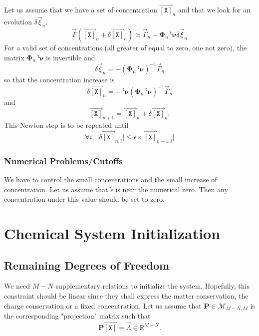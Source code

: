 \documentclass[aps,twocolumn]{revtex4}
\newcommand{\myconc}[1]{\left\lbrack #1 \right\rbrack}
\newcommand{\mychem}[1]{{\mathtt{#1}}}
\newcommand{\mymat}[1]{\boldsymbol{#1}}
\newcommand{\mytrn}[1]{{\!\!~^{\mathsf{t}}{#1}}}
\newcommand{\myvec}[1]{\overrightarrow{#1}}
\newcommand{\vecX}{\myvec{\myconc{\mychem{X}}}}
\begin{document}
Let us assume that we have a set of concentration $\vecX_{n}$ and that we look for an evolution $\delta\vec{\xi}_{n}$.
\begin{equation}
	\vec{\Gamma}\left(\vecX_{n}+\delta\vecX_{n}\right) \simeq \vec{\Gamma}_{n} + \mymat{\Phi}_n \mytrn{\mymat{\nu}} \delta\vec{\xi}_n
\end{equation}
For a valid set of concentrations (all greater of equal to zero, one not zero), the matrix $\mymat{\Phi}_n \mytrn{\mymat{\nu}}$ is invertible
and
\begin{equation}
	\delta\vec{\xi}_n = -\left(\mymat{\Phi}_n \mytrn{\mymat{\nu}}\right)^{-1} \vec{\Gamma}_{n}
\end{equation}
so that the concentration increase is
\begin{equation}
	\delta\vecX_{n} = - \mytrn{\mymat{\nu}}\left(\mymat{\Phi}_n \mytrn{\mymat{\nu}}\right)^{-1} \vec{\Gamma}_{n}
\end{equation}
and
\begin{equation}
	\vecX_{n+1} = \vecX_{n} + \delta\vecX_{n}.
\end{equation}
This Newton step is to be repeated until
\begin{equation}
	\forall i, \; \vert\delta\vecX_{n,i}\vert \leq \epsilon \times \vert\vecX_{n+1,i}\vert
\end{equation}

\subsubsection{Numerical Problems/Cutoffs}
We have to control the small concentrations and the small increase of concentration.
Let us assume that $\tilde\epsilon$ is near the numerical zero. Then any concentration under this value
should be set to zero. 


\section{Chemical System Initialization}
\subsection{Remaining Degrees of Freedom}
We need $M-N$ supplementary relations to initialize the system. Hopefully, this constraint should be linear
since they shall express the matter conservation, the charge conservation or a fixed concentration.
Let us assume that $\mymat{P}\in\mathcal{M}_{M-N,M}$ is the corresponding "projection" matrix such that
\begin{equation}
	\label{eq:proj}
	\mymat{P} \vecX = \vec{\Lambda} \in \mathbb{R}^{M-N}.
\end{equation}
\end{document}
